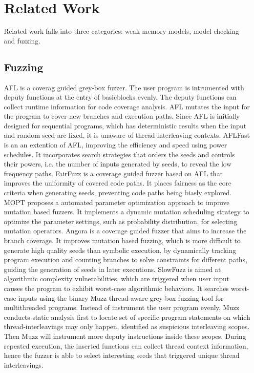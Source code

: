 \chapter{\label{cha:related}Related Work}

Related work falls into three categories: weak memory models, model checking and fuzzing.

\section{Fuzzing}

AFL\cite{afl} is a coverag guided grey-box fuzzer. The user program is intrumented with deputy functions at the entry of basicblocks evenly. The deputy functions can collect runtime information for code coverage analysis. AFL mutates the input for the program to cover new branches and execution paths. Since AFL is initially designed for sequential programs, which has deterministic results when the input and random seed are fixed, it is unaware of thread interleaving contexts.
AFLFast\cite{fuzz:aflfast} is an an extention of AFL, improving the efficiency and speed using power schedules. It incorporates search strategies that orders the seeds and controls their powers, i.e. the number of inputs generated by seeds, to reveal the low frequency paths.
FairFuzz\cite{fuzz:FairFuzz} is a coverage guided fuzzer based on AFL that improves the uniformity of covered code paths. It places fairness as the core criteria when generating seeds, preventing code paths being biasly explored.
MOPT\cite{fuzz:MOPT} proposes a automated parameter optimization approach to improve mutation based fuzzers. It implements a dynamic mutation scheduling strategy to optimize the parameter settings, such as probability distribution, for selecting mutation operators.
Angora\cite{fuzz:Angora} is a coverage guided fuzzer that aims to increase the branch coverage. It improves mutation based fuzzing, which is more difficult to generate high quality seeds than symbolic execution, by dynamically tracking program execution and counting branches to solve constraints for different paths, guiding the generation of seeds in later executions.
SlowFuzz\cite{fuzz:SlowFuzz} is aimed at algorithmic complexity vulnerabilities, which are triggered when user input causes the program to exhibit worst-case algorithmic behaviors. It searches worst-case inputs using the binary
Muzz\cite{muzz} thread-aware grey-box fuzzing tool for multithreaded programs. Instead of instrument the user program evenly, Muzz conducts static analysis first to locate set of specific program statements on which thread-interleavings may only happen, identified as suspicious interleaving scopes. Then Muzz will instrument more deputy instructions inside these scopes. During repeated execution, the inserted functions can collect thread context information, hence the fuzzer is able to select interesting seeds that triggered unique thread interleavings.
